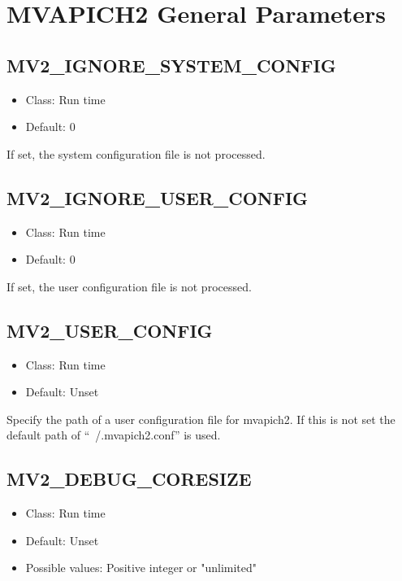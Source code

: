 \section{MVAPICH2 General Parameters}
\label{def:general-parameters}

\subsection{MV2\_IGNORE\_SYSTEM\_CONFIG}
\label{def:ignore-system-config}
\begin{itemize}
    \item Class: Run time
    \item Default: 0
\end{itemize}
If set, the system configuration file is not processed.

\subsection{MV2\_IGNORE\_USER\_CONFIG}
\label{def:ignore-user-config}
\begin{itemize}
    \item Class: Run time
    \item Default: 0
\end{itemize}
If set, the user configuration file is not processed.

\subsection{MV2\_USER\_CONFIG}
\label{def:user-config}
\begin{itemize}
    \item Class: Run time
    \item Default: Unset
\end{itemize}
Specify the path of a user configuration file for mvapich2.  If this is not set the default path of ``~/.mvapich2.conf'' is used.

\subsection{MV2\_DEBUG\_CORESIZE}
\label{def:debug-coresize}
\begin{itemize}
    \item Class: Run time
    \item Default: Unset
    \item Possible values: Positive integer or "unlimited"
\end{itemize}

